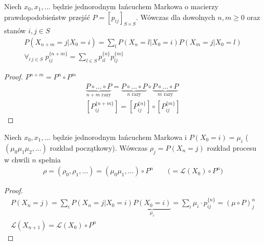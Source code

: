 \begin{twr}
Niech $ x_0,x_1,\dots  $ będzie jednorodnym łańcuchem Markowa o macierzy prawdopodobieństw przejść $ P=\left[p_{ij}\right]_{S\times S} $. Wówczas dla dowolnych $ n,m\ge 0 $ oraz stanów $ i,j\in S $
\begin{gather*}
P\left(X_{n+m}=j|X_0=i\right)
=\sum_lP\left(X_n=l|X_0=i\right)
P\left(X_m=j|X_0=l\right)\\
\forall_{i\,j\in S}\;p_{ij}^{\{n+m\}}=\sum_{l\in S}p_{il}^{\{n\}}p_{lj}^{\{m\}}
\end{gather*}
\begin{proof}
$ P^{n+m}=P^n\circ P^m $
\begin{gather*}
\underbrace{P\circ \dots \circ P}_{n+m\text{ razy}}=
\underbrace{P\circ \dots \circ P}_{n\text{ razy}}\circ
\underbrace{P\circ \dots \circ P}_{m\text{ razy}}\\
\left[P_{ij}^{\{n+m\}}\right]=
\left[P_{ij}^{\{n\}}\right]\circ
\left[P_{ij}^{\{m\}}\right]
\end{gather*}
\end{proof}
\end{twr}
\begin{twr}
Niech $ x_0,x_1,\dots  $ będzie jednorodnym łańcuchem Markowa i $ P(X_0=i)=\mu_i $ ($ (\mu_0\mu_1\mu_2,\dots ) $ rozkład początkowy). Wówczas $ \rho_j=P(X_n=j) $ rozkład procesu w chwili $ n $ spełnia
\begin{gather*}
\rho=(\rho_0,\rho_1,\dots)=
(\mu_0\mu_1,\dots)\circ P^n\qquad\bigl(=\mathcal L(X_0)\circ P^n\bigr)
\end{gather*}
\end{twr}
\begin{proof}
\begin{gather*}
P(X_n=j)=
\sum_iP(X_n=j|X_0=i)\underbrace{P(X_0=i)}_{\mu_i}=
\sum_i\mu_i\cdot p_{ij}^{\{n\}}=\left(\mu\circ P\right)^n_j\\
\mathcal L(X_{n+1})=\mathcal L(X_0)\circ P^n
\end{gather*}
\end{proof}